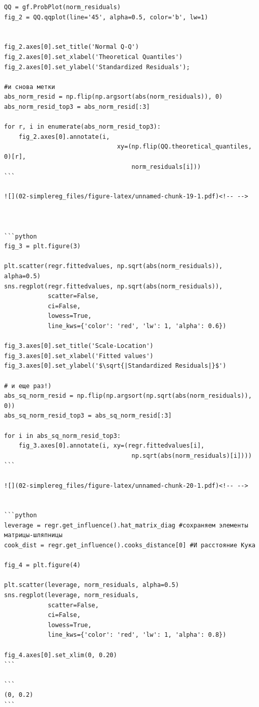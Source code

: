 \documentclass[]{book}
\begin{document}
\begin{verbatim}
QQ = gf.ProbPlot(norm_residuals)
fig_2 = QQ.qqplot(line='45', alpha=0.5, color='b', lw=1)


fig_2.axes[0].set_title('Normal Q-Q')
fig_2.axes[0].set_xlabel('Theoretical Quantiles')
fig_2.axes[0].set_ylabel('Standardized Residuals');

#и снова метки
abs_norm_resid = np.flip(np.argsort(abs(norm_residuals)), 0)
abs_norm_resid_top3 = abs_norm_resid[:3]

for r, i in enumerate(abs_norm_resid_top3):
    fig_2.axes[0].annotate(i, 
                               xy=(np.flip(QQ.theoretical_quantiles, 0)[r],
                                   norm_residuals[i]))
```

![](02-simplereg_files/figure-latex/unnamed-chunk-19-1.pdf)<!-- --> 



```python
fig_3 = plt.figure(3)

plt.scatter(regr.fittedvalues, np.sqrt(abs(norm_residuals)), alpha=0.5)
sns.regplot(regr.fittedvalues, np.sqrt(abs(norm_residuals)), 
            scatter=False, 
            ci=False, 
            lowess=True,
            line_kws={'color': 'red', 'lw': 1, 'alpha': 0.6})

fig_3.axes[0].set_title('Scale-Location')
fig_3.axes[0].set_xlabel('Fitted values')
fig_3.axes[0].set_ylabel('$\sqrt{|Standardized Residuals|}$')

# и еще раз!)
abs_sq_norm_resid = np.flip(np.argsort(np.sqrt(abs(norm_residuals)), 0))
abs_sq_norm_resid_top3 = abs_sq_norm_resid[:3]

for i in abs_sq_norm_resid_top3:
    fig_3.axes[0].annotate(i, xy=(regr.fittedvalues[i], 
                                   np.sqrt(abs(norm_residuals)[i])))
```

![](02-simplereg_files/figure-latex/unnamed-chunk-20-1.pdf)<!-- --> 


```python
leverage = regr.get_influence().hat_matrix_diag #сохраняем элементы матрицы-шляпницы
cook_dist = regr.get_influence().cooks_distance[0] #И расстояние Кука

fig_4 = plt.figure(4)

plt.scatter(leverage, norm_residuals, alpha=0.5)
sns.regplot(leverage, norm_residuals, 
            scatter=False, 
            ci=False, 
            lowess=True,
            line_kws={'color': 'red', 'lw': 1, 'alpha': 0.8})

fig_4.axes[0].set_xlim(0, 0.20)
```

```
(0, 0.2)
```


\end{verbatim}
\end{document}
